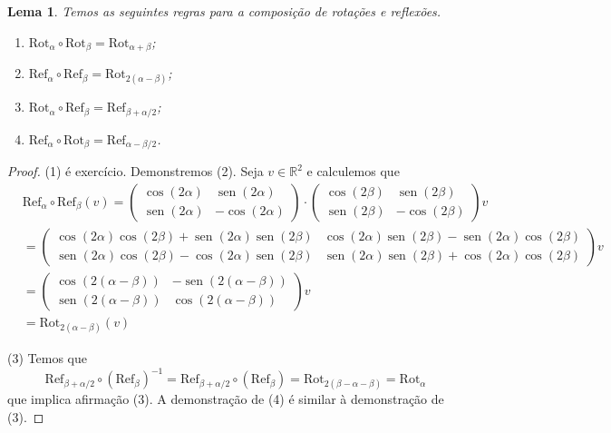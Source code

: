 \documentclass[12pt]{amsart}
\newcommand{\R}{\mathbb R}
\DeclareMathOperator{\sen}{\text{sen}}
\newcommand{\rot}[1]{{\textrm{Rot}}_{#1}}
\newcommand{\refl}[1]{{\textrm{Ref}}_{#1}}
\newtheorem{lemma}[theorem]{Lema}
\theoremstyle{definition}
\begin{document}
\begin{lemma}
    Temos as seguintes regras para a composição de rotações e reflexões.
    \begin{enumerate}
        \item $\rot{\alpha}\circ\rot{\beta}=\rot{\alpha+\beta}$;
        \item $\refl{\alpha}\circ\refl{\beta}=\rot{2(\alpha-\beta)}$;
        \item $\rot{\alpha}\circ\refl{\beta}=\refl{\beta+\alpha/2}$;
        \item $\refl{\alpha}\circ\rot{\beta}=\refl{\alpha-\beta/2}$.
    \end{enumerate}
\end{lemma}
\begin{proof}
    (1) é exercício. Demonstremos (2). Seja $v\in\R^2$ e calculemos que 
    \begin{align*}
        &\refl{\alpha}\circ\refl{\beta}(v)=\begin{pmatrix}\cos(2\alpha) & \sen (2\alpha)\\\sen (2\alpha) &-\cos (2\alpha)\end{pmatrix}\cdot \begin{pmatrix}\cos (2\beta) & \sen (2\beta)\\\sen(2\beta) &-\cos(2\beta)\end{pmatrix}v\\
        &=\begin{pmatrix}
            \cos(2\alpha)\cos(2\beta)+\sen(2\alpha)\sen(2\beta) & \cos(2\alpha)\sen(2\beta)-\sen(2\alpha)\cos(2\beta)\\
            \sen(2\alpha)\cos(2\beta)-\cos(2\alpha)\sen(2\beta) & 
            \sen(2\alpha)\sen(2\beta)+\cos(2\alpha)\cos(2\beta)
        \end{pmatrix}v\\
        &=\begin{pmatrix} \cos(2(\alpha-\beta)) &  -\sen(2(\alpha-\beta))\\
            \sen(2(\alpha-\beta)) & \cos(2(\alpha-\beta)) 
        \end{pmatrix} v \\
        &=\rot{2(\alpha-\beta)}(v)
    \end{align*}
    
    (3) Temos que 
    \[
        \refl{\beta+\alpha/2}\circ(\refl{\beta})^{-1}=\refl{\beta+\alpha/2}\circ(\refl{\beta})=\rot{2(\beta-\alpha-\beta)}=\rot{\alpha}
    \]
    que implica afirmação (3). A demonstração de (4) é similar à demonstração de (3).
\end{proof}
\end{document}
